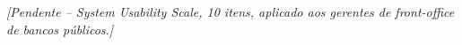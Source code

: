 \label{ane:questionario-sus}


\textit{[Pendente -- System Usability Scale, 10 itens, aplicado aos
gerentes de front-office de bancos p\'ublicos.]}

